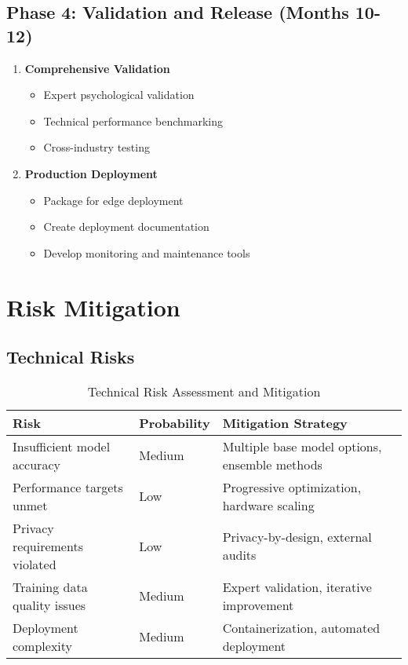 \documentclass[11pt,a4paper]{article}
\begin{document}
\subsection{Phase 4: Validation and Release (Months 10-12)}

\begin{enumerate}
\item \textbf{Comprehensive Validation}
   \begin{itemize}
   \item Expert psychological validation
   \item Technical performance benchmarking
   \item Cross-industry testing
   \end{itemize}

\item \textbf{Production Deployment}
   \begin{itemize}
   \item Package for edge deployment
   \item Create deployment documentation
   \item Develop monitoring and maintenance tools
   \end{itemize}
\end{enumerate}

\section{Risk Mitigation}

\subsection{Technical Risks}

\begin{table}[h!]
\centering
\caption{Technical Risk Assessment and Mitigation}
\label{tab:risks}
\begin{tabular}{lll}
\toprule
Risk & Probability & Mitigation Strategy \\
\midrule
Insufficient model accuracy & Medium & Multiple base model options, ensemble methods \\
Performance targets unmet & Low & Progressive optimization, hardware scaling \\
Privacy requirements violated & Low & Privacy-by-design, external audits \\
Training data quality issues & Medium & Expert validation, iterative improvement \\
Deployment complexity & Medium & Containerization, automated deployment \\
\bottomrule
\end{tabular}
\end{table}
\end{document}
